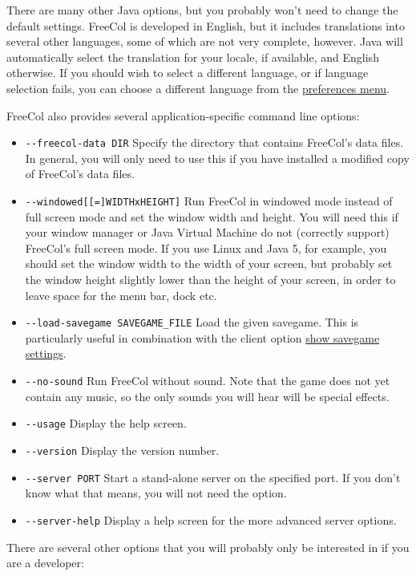 \documentclass[12pt]{book}
\begin{document}
There are many other Java options, but you probably won't need to
change the default settings. FreeCol is developed in English, but it
includes translations into several other languages, some of which are
not very complete, however. Java will automatically select the
translation for your locale, if available, and English otherwise. If
you should wish to select a different language, or if language
selection fails, you can choose a different language from the
\hyperlink{Client options}{preferences menu}.

FreeCol also provides several application-specific command line
options:

\begin{itemize}
\item\verb$--freecol-data DIR$ Specify the directory that contains
FreeCol's data files. In general, you will only need to use this if
you have installed a modified copy of FreeCol's data files.
\item\verb$--windowed[[=]WIDTHxHEIGHT]$ Run FreeCol in windowed mode
instead of full screen mode and set the window width and height. You
will need this if your window manager or Java Virtual Machine do not
(correctly support) FreeCol's full screen mode. If you use Linux and
Java 5, for example, you should set the window width to the width of
your screen, but probably set the window height slightly lower than
the height of your screen, in order to leave space for the menu bar,
dock etc.
\item\verb$--load-savegame SAVEGAME_FILE$ Load the given
savegame. This is particularly useful in combination with the client
option \hyperlink{show savegame settings}{show savegame settings}.
\item\verb$--no-sound$ Run FreeCol without sound. Note that the game
does not yet contain any music, so the only sounds you will hear will
be special effects.
\item\verb$--usage$ Display the help screen.
\item\verb$--version$ Display the version number.
\item\verb$--server PORT$ Start a stand-alone server on the specified
port. If you don't know what that means, you will not need the option.
\item\verb$--server-help$ Display a help screen for the more advanced
server options.
\end{itemize}

There are several other options that you will probably only be
interested in if you are a developer:
\end{document}
